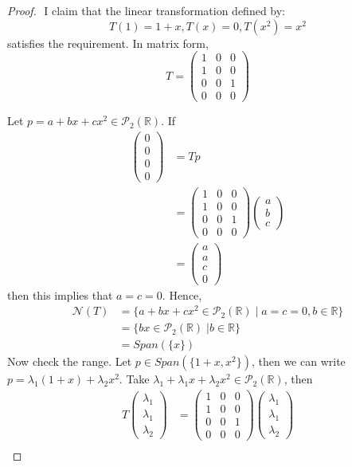 \documentclass{article}
\begin{document}
\begin{proof}
$ $\newline
I claim that the linear transformation defined by: $$T(1) = 1+x,T(x) = 0,T(x^2) = x^2$$ satisfies the requirement. In matrix form, $$T= \begin{pmatrix} 1&0&0 \\ 1&0&0 \\ 0&0&1 \\ 0&0&0 \end{pmatrix}$$

Let $p = a+bx+cx^2 \in \mathcal{P}_2(\mathbb{R})$. If
\begin{align*}
\begin{pmatrix} 0\\0\\0\\0 \end{pmatrix} &= T p \\
&= \begin{pmatrix} 1&0&0 \\ 1&0&0 \\ 0&0&1 \\ 0&0&0 \end{pmatrix} \begin{pmatrix} a \\ b\\c \end{pmatrix} \\
&= \begin{pmatrix} a \\a \\c \\ 0 \end{pmatrix} 
\end{align*}
then this implies that $a=c=0$. Hence, 
\begin{align*}
\mathcal{N}(T) &= \{ a+bx+cx^2 \in \mathcal{P}_2(\mathbb{R}) \; | \; a= c=0, b \in \mathbb{R} \} \\
&= \{ bx \in \mathcal{P}_2(\mathbb{R}) \; | b \in \mathbb{R} \} \\
&= Span(\{x\})
\end{align*}
Now check the range. Let $p \in Span(\{1+x, x^2 \})$, then we can write $p = \lambda_1(1+x) + \lambda_2x^2$. Take $\lambda_1 + \lambda_1 x + \lambda_2 x^2 \in \mathcal{P}_2(\mathbb{R})$, then 
\begin{align*}
T \begin{pmatrix} \lambda_1 \\ \lambda_1 \\ \lambda_2 \end{pmatrix} &=  \begin{pmatrix} 1&0&0 \\ 1&0&0 \\ 0&0&1 \\ 0&0&0 \end{pmatrix} \begin{pmatrix} \lambda_1 \\ \lambda_1 \\ \lambda_2 \end{pmatrix} \\

\end{align*}
\end{proof}
\end{document}

